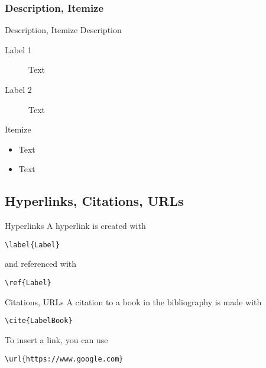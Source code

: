\subsubsection{Description, Itemize}
\begin{frame}{Description, Itemize}
Description

\vspace{.2cm}\begin{description}
	\item[Label 1] Text
	\item[Label 2] Text
\end{description}
Itemize

\begin{itemize}
	\item Text
	\item Text
\end{itemize}
\end{frame}


\subsection{Hyperlinks, Citations, URLs}

\begin{frame}{Hyperlinks}
A hyperlink is created with
\begin{verbatim}\label{Label}\end{verbatim}
and referenced with
\begin{verbatim}\ref{Label}\end{verbatim}
\end{frame}

\begin{frame}{Citations, URLs}
A citation to a book in the bibliography is made with	\begin{verbatim}\cite{LabelBook}\end{verbatim}

\vspace{.4cm}
To insert a link, you can use
\begin{verbatim}\url{https://www.google.com}\end{verbatim}
\end{frame}



